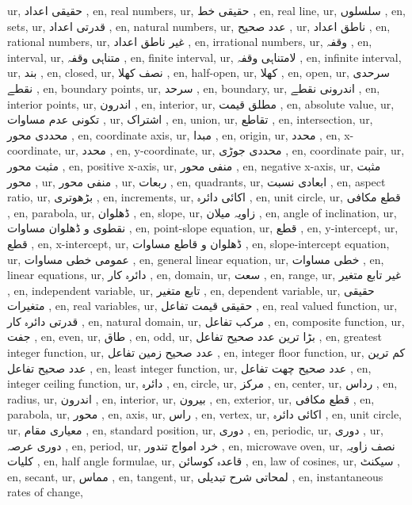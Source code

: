 ur, حقیقی اعداد ,
en, real numbers,
ur, حقیقی خط ,
en, real line,
ur, سلسلوں ,
en, sets,
ur, قدرتی اعداد ,
en, natural numbers,
ur, عدد صحیح ,
ur, ناطق اعداد ,
en, rational numbers,
ur, غیر ناطق اعداد ,
en, irrational numbers,
ur, وقفہ ,
en, interval,
ur, متناہی وقفہ ,
en, finite interval,
ur, لامتناہی وقفہ ,
en, infinite interval,
ur, بند ,
en, closed,
ur, نصف کھلا ,
en, half-open,
ur, کھلا ,
en, open,
ur, سرحدی نقطے ,
en, boundary points,
ur, سرحد ,
en, boundary,
ur, اندرونی نقطے ,
en, interior points,
ur, اندرون ,
en, interior,
ur, مطلق قیمت ,
en, absolute value,
ur, تکونی عدم مساوات ,
ur, اشتراک ,
en, union,
ur, تقاطع ,
en, intersection,
ur, محددی محور ,
en, coordinate axis,
ur, مبدا ,
en, origin,
ur,  محدد ,
en, x-coordinate,
ur,  محدد ,
en, y-coordinate,
ur, محددی جوڑی ,
en, coordinate pair,
ur, مثبت محور  ,
en, positive x-axis,
ur, منفی محور  ,
en, negative x-axis,
ur, مثبت محور  ,
ur, منفی محور  ,
ur, ربعات ,
en, quadrants,
ur, ابعادی نسبت ,
en, aspect ratio,
ur, بڑھوتری ,
en, increments,
ur, اکائی دائرہ ,
en, unit circle,
ur, قطع مکافی ,
en, parabola,
ur, ڈھلوان ,
en, slope,
ur, زاویہ میلان ,
en, angle of inclination,
ur, نقطوی و ڈھلوان مساوات ,
en, point-slope equation,
ur,  قطع ,
en, y-intercept,
ur,  قطع ,
en, x-intercept,
ur, ڈھلوان و قاطع مساوات ,
en, slope-intercept equation,
ur, عمومی خطی مساوات ,
en, general linear equation,
ur, خطی مساوات ,
en, linear equations,
ur, دائرہ کار ,
en, domain,
ur, سعت ,
en, range,
ur, غیر تابع متغیر ,
en, independent variable,
ur, تابع متغیر ,
en, dependent variable,
ur, حقیقی متغیرات ,
en, real variables,
ur, حقیقی قیمت تفاعل ,
en, real valued function,
ur, قدرتی دائرہ کار ,
en, natural domain,
ur, مرکب تفاعل ,
en, composite function,
ur, جفت ,
en, even,
ur, طاق ,
en, odd,
ur, بڑا ترین عدد صحیح تفاعل ,
en, greatest integer function,
ur, عدد صحیح زمین تفاعل ,
en, integer floor function,
ur, کم ترین عدد صحیح تفاعل ,
en, least integer function,
ur, عدد صحیح چھت تفاعل ,
en, integer ceiling function,
ur, دائرہ ,
en, circle,
ur, مرکز ,
en, center,
ur, رداس ,
en, radius,
ur, اندرون ,
en, interior,
ur, بیرون ,
en, exterior,
ur, قطع مکافی ,
en, parabola,
ur, محور ,
en, axis,
ur, راس ,
en, vertex,
ur, اکائی دائرہ ,
en, unit circle,
ur, معیاری مقام ,
en, standard position,
ur, دوری ,
en, periodic,
ur, دوری ,
ur, دوری عرصہ ,
en, period,
ur, خرد امواج تندور  ,
en, microwave oven,
ur, نصف زاویہ کلیات ,
en, half angle formulae,
ur, قاعدہ کوسائن ,
en, law of cosines,
ur, سیکنٹ ,
en, secant,
ur, مماس ,
en, tangent,
ur, لمحاتی شرح تبدیلی ,
en, instantaneous rates of change,

